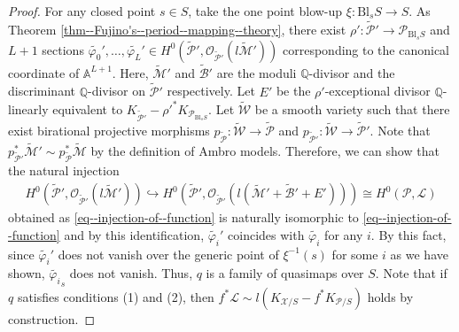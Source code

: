 \documentclass[12pt,twoside]{amsart}
\theoremstyle{definition}
\begin{document}
\begin{proof}
For any closed point $s\in S$, take the one point blow-up $\xi\colon \mathrm{Bl}_sS\to S$.
As Theorem \ref{thm--Fujino's--period--mapping--theory}, there exist $\rho'\colon \widetilde{\mathcal{P}}'\to\mathcal{P}_{\mathrm{Bl}_sS}$ and $L+1$ sections $\widetilde{\varphi_0}',\ldots,\widetilde{\varphi_L}'\in H^0(\tilde{\mathcal{P}}',\mathcal{O}_{\widetilde{\mathcal{P}}'}(l\widetilde{\mathcal{M}}'))$ corresponding to the canonical coordinate of $\mathbb{A}^{L+1}$.
Here, $\widetilde{\mathcal{M}}'$ and $\widetilde{\mathcal{B}}'$ are the moduli $\mathbb{Q}$-divisor and the discriminant $\mathbb{Q}$-divisor on $\tilde{\mathcal{P}}'$ respectively.
Let $E'$ be the $\rho'$-exceptional divisor $\mathbb{Q}$-linearly equivalent to $K_{\widetilde{\mathcal{P}}'}-\rho'^*K_{\mathcal{P}_{\mathrm{Bl}_sS}}$. 
Let $\widetilde{\mathcal{W}}$ be a smooth variety such that there exist birational projective morphisms $p_{\tilde{\mathcal{P}}}\colon \widetilde{\mathcal{W}}\to \tilde{\mathcal{P}}$ and $p_{\widetilde{\mathcal{P}}'}\colon \widetilde{\mathcal{W}}\to \widetilde{\mathcal{P}}'$.
Note that $p_{\widetilde{\mathcal{P}}'}^*\widetilde{\mathcal{M}}'\sim p_{\tilde{\mathcal{P}}}^*\widetilde{\mathcal{M}}$ by the definition of Ambro models.
Therefore, we can show that the natural injection
\begin{align*}
   H^0(\widetilde{\mathcal{P}}',\mathcal{O}_{\widetilde{\mathcal{P}}'}(l\widetilde{\mathcal{M}}'))\hookrightarrow H^0(\widetilde{\mathcal{P}}',\mathcal{O}_{\widetilde{\mathcal{P}}'}(l(\widetilde{\mathcal{M}}'+\widetilde{\mathcal{B}}'+E')))\cong H^0(\mathcal{P},\mathscr{L})
\end{align*}
obtained as \eqref{eq--injection-of--function} is naturally isomorphic to \eqref{eq--injection-of--function} and by this identification, $\widetilde{\varphi_i}'$ coincides with $\widetilde{\varphi_i}$ for any $i$.
By this fact, since $\widetilde{\varphi_i}'$ does not vanish over the generic point of $\xi^{-1}(s)$ for some $i$ as we have shown, $\widetilde{\varphi_i}_s$ does not vanish.
Thus, $q$ is a family of quasimaps over $S$.
Note that if $q$ satisfies conditions (1) and (2), then $f^*\mathscr{L}\sim l(K_{\mathcal{X}/S}-f^*K_{\mathcal{P}/S})$ holds by construction.


\end{proof}
\end{document}
